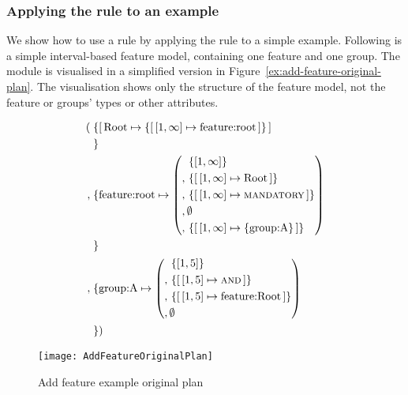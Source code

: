 \subsubsection{Applying the  rule to an example}

We show how to use a rule by applying the  rule to a simple example. Following is a simple interval-based feature model, containing one feature and one group. The module is visualised in a simplified version in Figure~\vref{ex:add-feature-original-plan}. The visualisation shows only the structure of the feature model, not the feature or groups' types or other attributes.

\begin{align*}
  (&\; \{  \mapping{\text{Root}}{\set{\intervalmapping{1}{\forever}{\text{feature:root}}}} \\
   &\; \}\\
    ,&\; \{  \text{feature:root} \mapsto \left( \begin{aligned}
          \, & \set{\interval{1}{\forever}} \\
       ,  \, & \set{\intervalmapping{1}{\forever}{\text{Root}}} \\
       ,  \, & \set{\intervalmapping{1}{\forever}{\mandatory}} \\
       ,  \, & \emptyset \\
       ,  \, & \set{\intervalmapping{1}{\forever}{\set{\text{group:A}}}} \\
  \end{aligned}\right) \\
   &\; \}\\ 
          ,&\; \{ \text{group:A} \mapsto \left( \begin{aligned}
                & \set{\interval{1}{5}} \\
                , \, & \set{\intervalmapping{1}{5}{\andtype}} \\
                , \, & \set{\intervalmapping{1}{5}{\text{feature:Root}}} \\
                , \, & \emptyset \\
            \end{aligned} \right) \\
   &\; \})
\end{align*}

\begin{figure}[h]
  \centering
  \texttt{[image: AddFeatureOriginalPlan]}
  \caption{Add feature example \textemdash{} original plan}
  \label{ex:add-feature-original-plan}
\end{figure}

